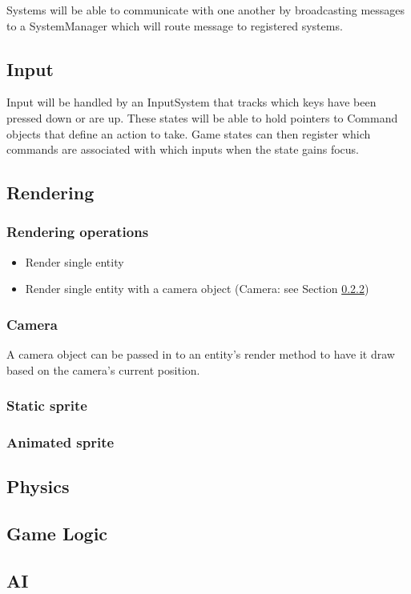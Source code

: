 \documentclass[12pt]{article}
\begin{document}
Systems will be able to communicate with one another by broadcasting messages to a SystemManager which will route message to registered systems.

\subsection{	Input }
Input will be handled by an InputSystem that tracks which keys have been pressed down or are up.  These states will be able to hold pointers to Command objects that define an action to take.  Game states can then register which commands are associated with which inputs when the state gains focus.
 

\subsection{	Rendering }
\subsubsection{Rendering operations }
	\begin{itemize}
		\item Render single entity
		\item Render single entity with a camera object (Camera: see Section \ref{sec:Camera})
	\end{itemize}

\subsubsection{ Camera} \label{sec:Camera}
A camera object can be passed in to an entity's render method to have it draw based on the camera's current position.

\subsubsection{Static sprite }
\subsubsection{Animated sprite }
\subsection{	Physics}
\subsection{	Game Logic}
\subsection{	AI}
\end{document}
